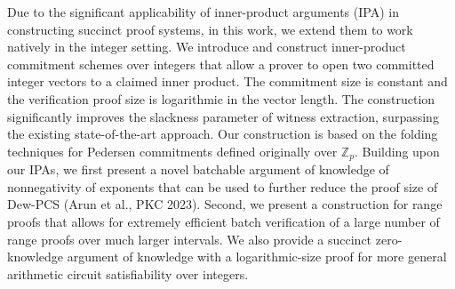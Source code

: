 \documentclass[11pt]{article}
\theoremstyle{definition}
\theoremstyle{remark}
\theoremstyle{plain}
\begin{document}
Due to the significant applicability of inner-product arguments (IPA) in constructing succinct proof systems, in this work, we extend them to work natively in the integer setting. We introduce and construct inner-product commitment schemes over integers that allow a prover to open two committed integer vectors to a claimed inner product. The commitment size is constant and the verification proof size is logarithmic in the vector length. The construction significantly improves the slackness parameter of witness extraction, surpassing the existing state-of-the-art approach. Our construction is based on the folding techniques for Pedersen commitments defined originally over $\mathbb{Z}_p$.
Building upon our IPAs, we first present a novel batchable argument of knowledge of nonnegativity of exponents that can be used to further reduce the proof size of Dew-PCS (Arun et al., PKC 2023). Second, we present a construction for range proofs that allows for extremely efficient batch verification of a large number of range proofs over much larger intervals. We also provide a succinct zero-knowledge argument of knowledge with a logarithmic-size proof for more general arithmetic circuit satisfiability over integers.



\end{document}
